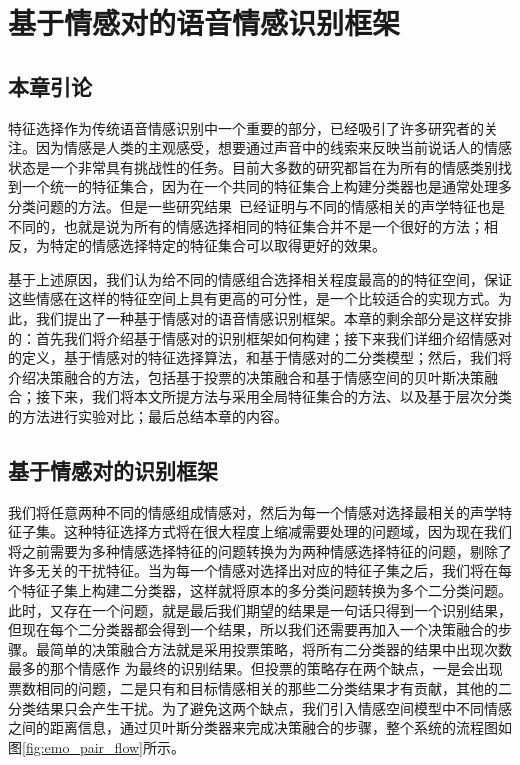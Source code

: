 \chapter{基于情感对的语音情感识别框架}
\label{cha:emo_pair_base_framework}

\section{本章引论}
\label{sec:emo_pair_base_framework_intro}
特征选择作为传统语音情感识别中一个重要的部分，已经吸引了许多研究者的关注。因为情感是人类的主观感受，想要通过声音中的线索来反映当前说话人的情感状态是一个非常具有挑战性的任务。目前大多数的研究都旨在为所有的情感类别找到一个统一的特征集合，因为在一个共同的特征集合上构建分类器也是通常处理多分类问题的方法。但是一些研究结果~\cite{Lee2009Emotion}已经证明与不同的情感相关的声学特征也是不同的，也就是说为所有的情感选择相同的特征集合并不是一个很好的方法；相反，为特定的情感选择特定的特征集合可以取得更好的效果。

基于上述原因，我们认为给不同的情感组合选择相关程度最高的的特征空间，保证这些情感在这样的特征空间上具有更高的可分性，是一个比较适合的实现方式。为此，我们提出了一种基于情感对的语音情感识别框架。本章的剩余部分是这样安排的：首先我们将介绍基于情感对的识别框架如何构建；接下来我们详细介绍情感对的定义，基于情感对的特征选择算法，和基于情感对的二分类模型；然后，我们将介绍决策融合的方法，包括基于投票的决策融合和基于情感空间的贝叶斯决策融合；接下来，我们将本文所提方法与采用全局特征集合的方法、以及基于层次分类的方法进行实验对比；最后总结本章的内容。

\section{基于情感对的识别框架}
\label{sec:emo_pair_base_framework}
我们将任意两种不同的情感组成情感对，然后为每一个情感对选择最相关的声学特征子集。这种特征选择方式将在很大程度上缩减需要处理的问题域，因为现在我们将之前需要为多种情感选择特征的问题转换为为两种情感选择特征的问题，剔除了许多无关的干扰特征。当为每一个情感对选择出对应的特征子集之后，我们将在每个特征子集上构建二分类器，这样就将原本的多分类问题转换为多个二分类问题。此时，又存在一个问题，就是最后我们期望的结果是一句话只得到一个识别结果，但现在每个二分类器都会得到一个结果，所以我们还需要再加入一个决策融合的步骤。最简单的决策融合方法就是采用投票策略，将所有二分类器的结果中出现次数最多的那个情感作  为最终的识别结果。但投票的策略存在两个缺点，一是会出现票数相同的问题，二是只有和目标情感相关的那些二分类结果才有贡献，其他的二分类结果只会产生干扰。为了避免这两个缺点，我们引入情感空间模型中不同情感之间的距离信息，通过贝叶斯分类器来完成决策融合的步骤，整个系统的流程图如图\ref{fig:emo_pair_flow}所示。

